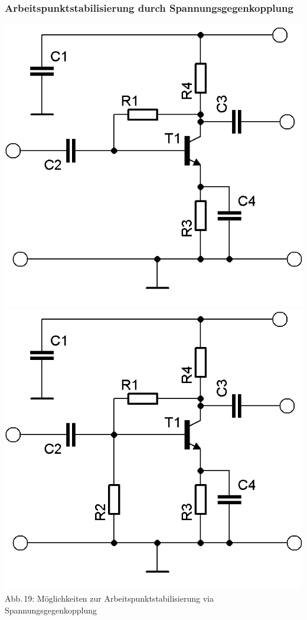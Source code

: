 \begin{frame}
    \frametitle{Arbeitspunktstabilisierung durch Spannungsgegenkopplung}
	\begin{center}
		\includegraphics[width=.4\textwidth,height=.85\textheight,keepaspectratio]{a06/Transistor-Verstaerker-APstab2a.png}
		\vspace{3mm}
		\includegraphics[width=.4\textwidth,height=.85\textheight,keepaspectratio]{a06/Transistor-Verstaerker-APstab2b.png}\\
		{\tiny Abb.\,19: Möglichkeiten zur Arbeitspunktstabilisierung via Spannungsgegenkopplung}
	\end{center}
\end{frame}

